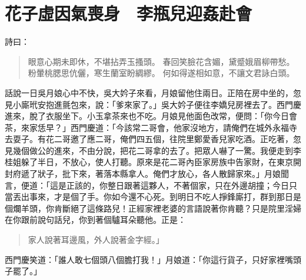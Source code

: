 
\chapter{花子虛因氣喪身　李瓶兒迎姦赴會}

詩曰：
\begin{quote}
眼意心期未即休，不堪拈弄玉搔頭。
春回笑臉花含媚，黛蹙娥眉柳帶愁。
粉暈桃腮思伉儷，寒生蘭室盼綢繆。
何如得遂相如意，不讓文君詠白頭。
\end{quote}

話說一日吳月娘心中不快，吳大妗子來看，月娘留他住兩日。正陪在房中坐的，忽見小廝玳安抱進氈包來，說：「爹來家了。」吳大妗子便往李嬌兒房裡去了。西門慶進來，脫了衣服坐下。小玉拿茶來也不吃。月娘見他面色改常，便問：「你今日會茶，來家恁早？」西門慶道：「今該常二哥會，他家沒地方，請俺們在城外永福寺去耍子。有花二哥邀了應二哥，俺們四五個，往院里鄭愛香兒家吃酒。正吃著，忽見幾個做公的進來，不由分說，把花二哥拿的去了。把眾人嚇了一驚。我便走到李桂姐躲了半日，不放心，使人打聽。原來是花二哥內臣家房族中告家財，在東京開封府遞了狀子，批下來，著落本縣拿人。俺們才放心，各人散歸家來。」月娘聞言，便道：「這是正該的，你整日跟著這夥人，不著個家，只在外邊胡撞；今日只當丟出事來，才是個了手。你如今還不心死。到明日不吃人掙鋒廝打，群到那日是個爛羊頭，你肯斷絕了這條路兒！正經家裡老婆的言語說著你肯聽？只是院里淫婦在你跟前說句話兒，你到著個驢耳朵聽他。正是：
\begin{quote}
家人說著耳邊風，外人說著金字經。」
\end{quote}
西門慶笑道：「誰人敢七個頭八個膽打我！」月娘道：「你這行貨子，只好家裡嘴頭子罷了。」

